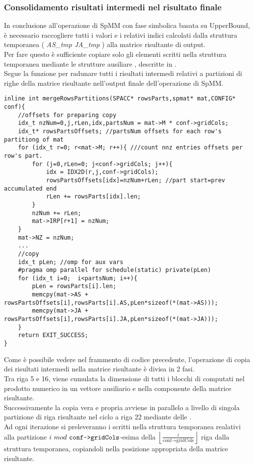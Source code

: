 \subsubsection{Consolidamento risultati intermedi nel risultato finale} \label{chSpMMNum:mergeRows}
In conclusione all'operazione di SpMM con fase simbolica basata su UpperBound, 
è necessario raccogliere tutti i valori \nnz e i relativi indici calcolati 
dalla struttura temporanea ( \emph{AS\_tmp JA\_tmp} ) alla matrice risultante di output.\\
Per fare questo è sufficiente copiare solo gli elementi \nnz scritti nella struttura temporanea
mediante le strutture ausiliare , descritte in .\\
Segue la funzione per radunare tutti i risultati intermedi relativi a partizioni di righe della matrice 
risultante nell'output finale dell'operazione di SpMM.\\
\begin{lstlisting}
inline int mergeRowsPartitions(SPACC* rowsParts,spmat* mat,CONFIG* conf){
    //offsets for preparing copy 
    idx_t nzNum=0,j,rLen,idx,partsNum = mat->M * conf->gridCols;
    idx_t* rowsPartsOffsets; //partsNum offsets for each row's partitiong of mat
    for (idx_t r=0; r<mat->M; r++){	///count nnz entries offsets per row's part.
        for (j=0,rLen=0; j<conf->gridCols; j++){
            idx = IDX2D(r,j,conf->gridCols);
            rowsPartsOffsets[idx]=nzNum+rLen; //part start=prev accumulated end
            rLen += rowsParts[idx].len;
        }
        nzNum += rLen;
        mat->IRP[r+1] = nzNum;
    }
    mat->NZ = nzNum;
    ...
    //copy
    idx_t pLen; //omp for aux vars
    #pragma omp parallel for schedule(static) private(pLen)
    for (idx_t i=0;  i<partsNum; i++){
        pLen = rowsParts[i].len;
        memcpy(mat->AS + rowsPartsOffsets[i],rowsParts[i].AS,pLen*sizeof(*(mat->AS)));
        memcpy(mat->JA + rowsPartsOffsets[i],rowsParts[i].JA,pLen*sizeof(*(mat->JA)));
    }
    return EXIT_SUCCESS;
}
\end{lstlisting}
Come è possibile vedere nel frammento di codice precedente, l'operazione di copia dei risultati
intermedi nella matrice risultante è divisa in 2 fasi.\\
Tra riga 5 e 16, viene cumulata la dimensione di tutti i blocchi di \nnz computati
nel prodotto numerico in un vettore ausiliario  e nella componente 
 della matrice risultante.\\
Successivamente la copia vera e propria avviene in parallelo 
a livello di singola partizione di riga risultante nel ciclo a riga 22 mediante delle .\\
Ad ogni iterazione si preleveranno i \nnz scritti nella struttura temporanea realativi
alla partizione $i~mod~ \verb|conf->gridCols|$-esima della $\left\lfloor \frac{i}{\text{conf} \rightarrow \text{gridCols}} \right\rfloor$
riga dalla struttura temporanea, copiandoli nella posizione appropriata della matrice risultante.\\



